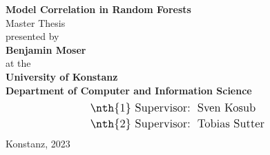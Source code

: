 \documentclass[
	twoside=false, %
]{kaobook}
\begin{document}
\begin{titlepage}
  \begin{center}
    {\huge \textbf{Model Correlation in Random Forests}}
    \\[2em]
    {\Large {Master Thesis}}
    \\[5.5em]
    {\Large presented by}
    \\[1.5em]
    {\Large \textbf{Benjamin Moser}}
    \\[1.5em]
    {\Large at the}
    \\[1.2em]
    {\Large \textbf{University of Konstanz}}
    \\[1.0em]
    {\Large \textbf{Department of Computer and Information Science}}
    \\[4em]
    \begin{align*}
      \text{\large {\nth{1} Supervisor}:~} &  \text{ \large Sven Kosub } \\
      \text{\large {\nth{2} Supervisor}:~} &  \text{ \large Tobias Sutter } \\
    \end{align*}
    \vfill
    {\Large {Konstanz, 2023}}
  \end{center}
\end{titlepage}

\end{document}

